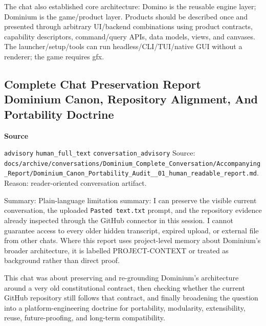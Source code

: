 \documentclass[9pt,a4paper,openany]{book}
\newcommand{\vonecallout}[3]{\par\medskip\noindent\begingroup\setlength{\fboxsep}{7pt}\colorbox{DomCalloutBg}{\parbox{0.94\linewidth}{\textbf{\textcolor{#1}{#2}}\par #3}}\endgroup\par\medskip}
\begin{document}
The chat also established core architecture: Domino is the reusable engine layer; Dominium is the game/\allowbreak{}product layer.\allowbreak{} Products should be described once and presented through arbitrary UI/\allowbreak{}backend combinations using product contracts, capability descriptors, command/\allowbreak{}query APIs, data models, views, and canvases.\allowbreak{} The launcher/\allowbreak{}setup/\allowbreak{}tools can run headless/\allowbreak{}CLI/\allowbreak{}TUI/\allowbreak{}native GUI without a renderer; the game requires gfx.\allowbreak{}



\subsection{Complete Chat Preservation Report Dominium Canon, Repository Alignment, And Portability Doctrine}

\vonecallout{DomSlate}{Source}{\texttt{advisory} \texttt{human\_\allowbreak{}full\_\allowbreak{}text} \texttt{conversation\_\allowbreak{}advisory} Source: \texttt{docs/\allowbreak{}archive/\allowbreak{}conversations/\allowbreak{}Dominium\_\allowbreak{}Complete\_\allowbreak{}Conversation/\allowbreak{}Accompanying\_\allowbreak{}Report/\allowbreak{}Dominium\_\allowbreak{}Canon\_\allowbreak{}Portability\_\allowbreak{}Audit\_\allowbreak{}\_\allowbreak{}01\_\allowbreak{}human\_\allowbreak{}readable\_\allowbreak{}report.\allowbreak{}md}.\allowbreak{} Reason: reader-\allowbreak{}oriented conversation artifact.\allowbreak{}}

Summary: Plain-\allowbreak{}language limitation summary: I can preserve the visible current conversation, the uploaded \texttt{Pasted text.\allowbreak{}txt} prompt, and the repository evidence already inspected through the GitHub connector in this session.\allowbreak{} I cannot guarantee access to every older hidden transcript, expired upload, or external file from other chats.\allowbreak{} Where this report uses project-\allowbreak{}level memory about Dominium's broader architecture, it is labelled PROJECT-\allowbreak{}CONTEXT or treated as background rather than direct proof.\allowbreak{}


This chat was about preserving and re-\allowbreak{}grounding Dominium's architecture around a very old constitutional contract, then checking whether the current GitHub repository still follows that contract, and finally broadening the question into a platform-\allowbreak{}engineering doctrine for portability, modularity, extensibility, reuse, future-\allowbreak{}proofing, and long-\allowbreak{}term compatibility.\allowbreak{}
\end{document}
